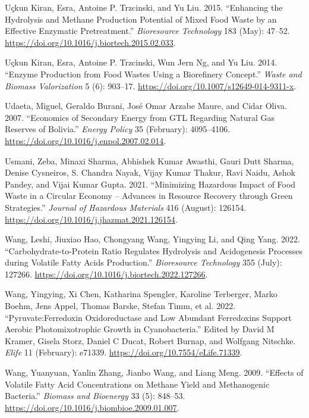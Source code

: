 \documentclass[11pt]{report}
\begin{document}
\begin{hangparas}{1.5em}{1}
\hypertarget{citeproc_bib_item_79}{Uçkun Kiran, Esra, Antoine P. Trzcinski, and Yu Liu. 2015. “Enhancing the Hydrolysis and Methane Production Potential of Mixed Food Waste by an Effective Enzymatic Pretreatment.” \textit{Bioresource Technology} 183 (May): 47–52. \url{https://doi.org/10.1016/j.biortech.2015.02.033}.}

\hypertarget{citeproc_bib_item_80}{Uçkun Kiran, Esra, Antoine P. Trzcinski, Wun Jern Ng, and Yu Liu. 2014. “Enzyme Production from Food Wastes Using a Biorefinery Concept.” \textit{Waste and Biomass Valorization} 5 (6): 903–17. \url{https://doi.org/10.1007/s12649-014-9311-x}.}

\hypertarget{citeproc_bib_item_81}{Udaeta, Miguel, Geraldo Burani, José Omar Arzabe Maure, and Cidar Oliva. 2007. “Economics of Secondary Energy from GTL Regarding Natural Gas Reserves of Bolivia.” \textit{Energy Policy} 35 (February): 4095–4106. \url{https://doi.org/10.1016/j.enpol.2007.02.014}.}

\hypertarget{citeproc_bib_item_82}{Usmani, Zeba, Minaxi Sharma, Abhishek Kumar Awasthi, Gauri Dutt Sharma, Denise Cysneiros, S. Chandra Nayak, Vijay Kumar Thakur, Ravi Naidu, Ashok Pandey, and Vijai Kumar Gupta. 2021. “Minimizing Hazardous Impact of Food Waste in a Circular Economy – Advances in Resource Recovery through Green Strategies.” \textit{Journal of Hazardous Materials} 416 (August): 126154. \url{https://doi.org/10.1016/j.jhazmat.2021.126154}.}

\hypertarget{citeproc_bib_item_83}{Wang, Leshi, Jiuxiao Hao, Chongyang Wang, Yingying Li, and Qing Yang. 2022. “Carbohydrate-to-Protein Ratio Regulates Hydrolysis and Acidogenesis Processes during Volatile Fatty Acids Production.” \textit{Bioresource Technology} 355 (July): 127266. \url{https://doi.org/10.1016/j.biortech.2022.127266}.}

\hypertarget{citeproc_bib_item_84}{Wang, Yingying, Xi Chen, Katharina Spengler, Karoline Terberger, Marko Boehm, Jens Appel, Thomas Barske, Stefan Timm, et al. 2022. “Pyruvate:Ferredoxin Oxidoreductase and Low Abundant Ferredoxins Support Aerobic Photomixotrophic Growth in Cyanobacteria.” Edited by David M Kramer, Gisela Storz, Daniel C Ducat, Robert Burnap, and Wolfgang Nitschke. \textit{Elife} 11 (February): e71339. \url{https://doi.org/10.7554/eLife.71339}.}

\hypertarget{citeproc_bib_item_85}{Wang, Yuanyuan, Yanlin Zhang, Jianbo Wang, and Liang Meng. 2009. “Effects of Volatile Fatty Acid Concentrations on Methane Yield and Methanogenic Bacteria.” \textit{Biomass and Bioenergy} 33 (5): 848–53. \url{https://doi.org/10.1016/j.biombioe.2009.01.007}.}


\end{hangparas}
\end{document}
